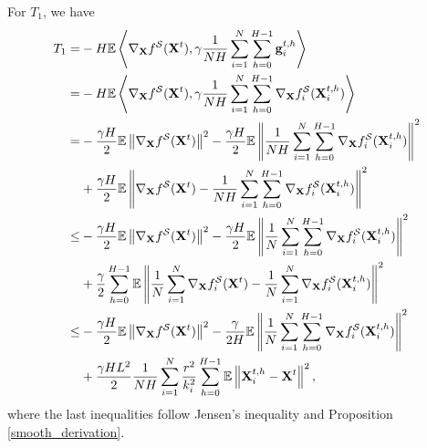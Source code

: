 \documentclass{article} %
\theoremstyle{plain}
\theoremstyle{definition}
\begin{document}
For \(T_1\), we have 
\begin{align}
    T_1 =& -H\mathbb{E}\left \langle
    \nabla_{\bf X} f^{\mathcal{S}} ({\bf X}^t), \gamma \frac{1}{NH} \sum_{i=1}^{N} \sum_{h=0}^{H-1} {\bf g}^{t,h}_i
    \right \rangle \nonumber \\
    =& -H\mathbb{E} \left \langle
    \nabla_{\bf X} f^{\mathcal{S}} ({\bf X}^t), \gamma \frac{1}{NH} \sum_{i=1}^{N} \sum_{h=0}^{H-1} \nabla_{\bf X} f_i^{\mathcal{S}} ({\bf X}_i^{t,h})
    \right \rangle \nonumber\\
    =&  -\frac{\gamma H}{2} \mathbb{E} \left\| \nabla_{\bf X} f^{\mathcal{S}} ({\bf X}^t) \right\|^2 - \frac{\gamma H}{2} \mathbb{E} \left\| \frac{1}{NH} \sum_{i=1}^{N} \sum_{h=0}^{H-1} \nabla_{\bf X} f_i^{\mathcal{S}} ({\bf X}_i^{t,h}) \right\|^2
    \nonumber\\
    & + \frac{\gamma H}{2} \mathbb{E} \left \|
    \nabla_{\bf X} f^{\mathcal{S}} ({\bf X}^t) - \frac{1}{NH} \sum_{i=1}^{N} \sum_{h=0}^{H-1} \nabla_{\bf X} f_i^{\mathcal{S}} ({\bf X}_i^{t,h}) 
    \right \|^2 \nonumber\\
    \leq&  - \frac{\gamma H}{2} \mathbb{E} \left\| \nabla_{\bf X} f^{\mathcal{S}} ({\bf X}^t) \right\|^2 - \frac{\gamma H}{2} \mathbb{E} \left\| \frac{1}{N} \sum_{i=1}^{N} \sum_{h=0}^{H-1} \nabla_{\bf X} f_i^{\mathcal{S}} ({\bf X}_i^{t,h}) \right\|^2
    \nonumber\\
    & + \frac{\gamma}{2} \sum_{h=0}^{H-1} \mathbb{E} \left \|\frac{1}{N} \sum_{i=1}^{N} \nabla_{\bf X} f_i^{\mathcal{S}} ({\bf X}^t) - \frac{1}{N} \sum_{i=1}^{N} \nabla_{\bf X} f_i^{\mathcal{S}} ({\bf X}_i^{t,h}) 
    \right \|^2 \nonumber\\
    \leq&  - \frac{\gamma H}{2} \mathbb{E} \left\| \nabla_{\bf X} f^{\mathcal{S}} ({\bf X}^t) \right\|^2 - \frac{\gamma }{2H} \mathbb{E} \left\| \frac{1}{N} \sum_{i=1}^{N} \sum_{h=0}^{H-1} \nabla_{\bf X} f_i^{\mathcal{S}} ({\bf X}_i^{t,h}) \right\|^2 \nonumber \\
    & + \frac{\gamma H L^2}{2}  \frac{1}{NH} \sum_{i=1}^{N} \frac{r^2}{k_i^2} \sum_{h=0}^{H-1} \mathbb{E} \left \|{\bf X}_i^{t,h} -{\bf X}^t
    \right \|^2, \label{T_1}
\end{align}
where the last inequalities follow Jensen's inequality and Proposition \ref{smooth_derivation}. 
\end{document}
